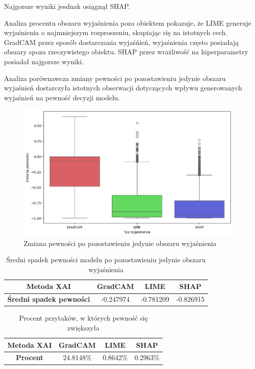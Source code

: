 Najgorsze wyniki jesdnak osiągnął SHAP.

Analiza procentu obszaru wyjaśnienia poza obiektem pokazuje, że LIME generuje wyjaśnienia o najmniejszym rozproszeniu, skupiając się na istotnych cech.
GradCAM przez sposób dostarczania wyjaśńień, wyjaśnienia często posiadają obszary spoza rzeczywistego obiektu.
SHAP przez wrażliwość na hiperparametry posiadał najgorsze wyniki.

\vspace{1cm}

Analiza porównawcza zmiany pewności po pozostawieniu jedynie obszaru wyjaśnień dostarczyła istotnych obserwacji dotyczących wpływu generowanych wyjaśnień na pewność decyzji modelu.

\begin{figure}[h]
	\centering\includegraphics[width=.9\textwidth]{img/base_confidence_exp}
	\caption{Zmiana pewności po pozostawieniu jedynie obszaru wyjaśnienia}  \label{rys:base_confidence_exp}
\end{figure}

\begin{table}[h]
	\centering
	\begin{tabular}{|c|c|c|c|}
		\hline
		\textbf{Metoda XAI}             & \textbf{GradCAM} & \textbf{LIME} & \textbf{SHAP} \\
		\hline
		\textbf{Średni spadek pewności} & -0.247974        & -0.781209     & -0.826915     \\
		\hline
	\end{tabular}
	\caption{Średni spadek pewności modelu po pozostawieniu jedynie obszaru wyjaśnienia}
	\label{tab:base_confidence_exp}
\end{table}

\begin{table}[h]
	\centering
	\begin{tabular}{|c|c|c|c|}
		\hline
		\textbf{Metoda XAI} & \textbf{GradCAM} & \textbf{LIME} & \textbf{SHAP} \\
		\hline
		\textbf{Procent}    & 24.8148\%        & 0.8642\%      & 0.2963\%      \\
		\hline
	\end{tabular}
	\caption{Procent przytaków, w których pewność się zwiększyła}
	\label{tab:base_confidence_exp_percent}
\end{table}

